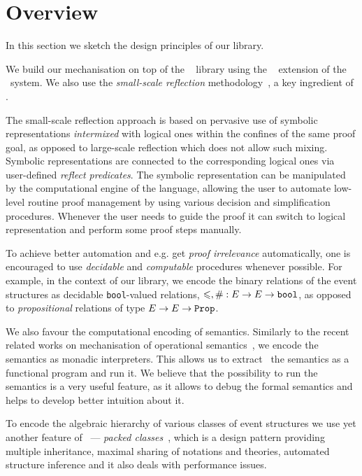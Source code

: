 \section{Overview}

In this section we sketch the design principles of our library. 

We build our mechanisation on top of the \mathcomp~\cite{Mahboubi-Tassi:MATHCOMP17} library 
using the \ssreflect~\cite{Gonthier-al:SSR2016} extension of the \coq~system.
We also use the \emph{small-scale reflection} 
methodology~\cite{Gonthier-Assia:SSR2010, Gonthier-al:SSR2016}, 
a key ingredient of \ssreflect. 

The small-scale reflection approach is based on 
pervasive use of symbolic representations \emph{intermixed}
with logical ones within the confines of the same proof goal,
as opposed to large-scale reflection which does not allow such mixing.
Symbolic representations are connected to the corresponding logical ones
via user-defined \emph{reflect predicates}.
The symbolic representation can be manipulated 
by the computational engine of the language, 
allowing the user to automate low-level routine 
proof management by using various decision 
and simplification procedures.
Whenever the user needs to guide the proof 
it can switch to logical representation
and perform some proof steps manually. 

To achieve better automation and e.g. get \emph{proof irrelevance}
automatically, one is encouraged
to use \emph{decidable} and \emph{computable} procedures
whenever possible.
For example, in the context of our library, 
we encode the binary relations of the event structures
as decidable \texttt{bool}-valued relations, 
\ie $\leqslant, \# : E \rightarrow E \rightarrow \texttt{bool}$,
as opposed to \emph{propositional} 
relations of type $E \rightarrow E \rightarrow \texttt{Prop}$. 

We also favour the computational encoding of semantics. 
Similarly to the recent related works on mechanisation 
of operational semantics~\cite{Xia-al:POPL2019, Letan-al:CPP2020, Affeldt-al:ICMPC2019}, 
we encode the semantics as monadic interpreters.  
This allows us to extract~\cite{Letouzey:CCE2008} 
the semantics as a functional program and run it. 
We believe that the possibility to run the semantics 
is a very useful feature, as it allows 
to debug the formal semantics
and helps to develop better intuition about it.

To encode the algebraic hierarchy of various classes of event structures
we use yet another feature of \mathcomp~--- 
\emph{packed classes}~\cite{Garillot-al:ICTPHOL2009},
which is a design pattern providing multiple inheritance,
maximal sharing of notations and theories,
automated structure inference and it also deals with performance issues.

